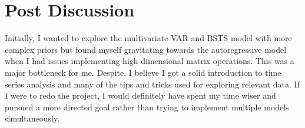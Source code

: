 \documentclass{article}
\begin{document}
\section*{Post Discussion}

Initially, I wanted to explore the multivariate VAR  and BSTS model with more complex priors but found myself gravitating towards the autoregressive model when I had issues implementing high dimensional matrix operations. This was a major bottleneck for me. Despite, I believe I got a solid introduction to time series analysis and many of the tips and tricks used for exploring relevant data. If I were to redo the project, I would definitely have spent my time wiser and pursued a more directed goal rather than trying to implement multiple models simultaneously.
\end{document}
